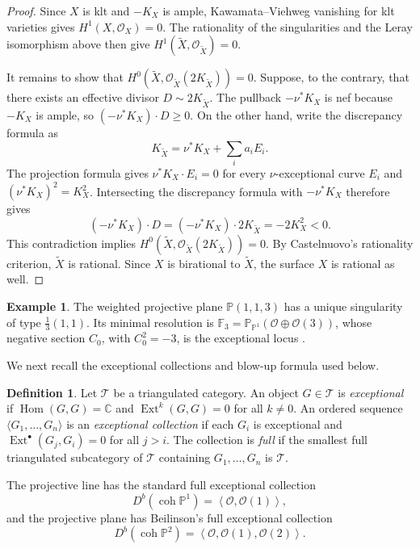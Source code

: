 \documentclass[11pt]{article}
\theoremstyle{plain}
\theoremstyle{definition}
\newtheorem{definition}[definition]{Definition}
\newtheorem{example}[example]{Example}
\theoremstyle{remark}
\newcommand{\Pp}{\mathbb P}
\newcommand{\F}{\mathbb F}
\newcommand{\C}{\mathbb C}
\newcommand{\Db}{D^b}
\newcommand{\coh}{\operatorname{coh}}
\newcommand{\Hom}{\operatorname{Hom}}
\newcommand{\Ext}{\operatorname{Ext}}
\newcommand{\OO}{\mathcal O}
\begin{document}
\begin{proof}
Since \(X\) is klt and \(-K_X\) is ample, Kawamata--Viehweg vanishing for
klt varieties \cite[Theorem~2.70]{Kollar1998} gives
\(H^1(X,\OO_X)=0\). The rationality of the singularities and the Leray
isomorphism above then give
\(H^1(\widetilde X,\OO_{\widetilde X})=0\).

It remains to show that \(H^0(\widetilde X,\OO_{\widetilde X}(2K_{\widetilde X}))=0\). Suppose, to the contrary, that there exists an effective divisor \(D\sim 2K_{\widetilde X}\). The pullback \(-\nu^*K_X\) is nef because \(-K_X\) is ample, so \((-\nu^*K_X)\cdot D\geq 0\). On the other hand, write the discrepancy formula as
\[
K_{\widetilde X}=\nu^*K_X+\sum_i a_iE_i.
\]
The projection formula gives \(\nu^*K_X\cdot E_i=0\) for every
\(\nu\)-exceptional curve \(E_i\) and \((\nu^*K_X)^2=K_X^2\).
Intersecting the discrepancy formula with \(-\nu^*K_X\) therefore gives
\[
(-\nu^*K_X)\cdot D
=
(-\nu^*K_X)\cdot 2K_{\widetilde X}
=
-2K_X^2<0.
\]
This contradiction implies \(H^0(\widetilde X,\OO_{\widetilde X}(2K_{\widetilde X}))=0\). By Castelnuovo's rationality criterion, \(\widetilde X\) is rational. Since \(X\) is birational to \(\widetilde X\), the surface \(X\) is rational as well.
\end{proof}

\begin{example}
The weighted projective plane \(\Pp(1,1,3)\) has a unique singularity
of type \(\frac13(1,1)\). Its minimal resolution is
\(\F_3=\Pp_{\Pp^1}(\OO\oplus\OO(3))\), whose negative section
\(C_0\), with \(C_0^2=-3\), is the exceptional locus
\cite[Example~3.17]{KKS2020}.
\end{example}

We next recall the exceptional collections and blow-up formula used below.

\begin{definition}
Let \(\mathcal T\) be a triangulated category. An object \(G\in\mathcal T\) is \emph{exceptional} if \(\Hom(G,G)=\C\) and \(\Ext^k(G,G)=0\) for all \(k\neq 0\). An ordered sequence \(\langle G_1,\dots,G_n\rangle\) is an \emph{exceptional collection} if each \(G_i\) is exceptional and \(\Ext^\bullet(G_j,G_i)=0\) for all \(j>i\). The collection is \emph{full} if the smallest full triangulated subcategory of \(\mathcal T\) containing \(G_1,\ldots,G_n\) is \(\mathcal T\).
\end{definition}

The projective line has the standard full exceptional collection
\[
\Db(\coh \Pp^1)=\left\langle \OO,\OO(1)\right\rangle,
\]
and the projective plane has Beilinson's full exceptional collection \cite{Beilinson1978}
\[
\Db(\coh \Pp^2)=\left\langle \OO,\OO(1),\OO(2)\right\rangle.
\]
\end{document}
